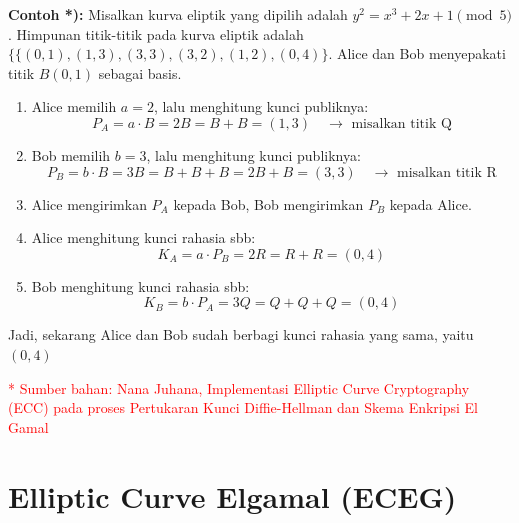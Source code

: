 \documentclass{article}
\begin{document}
\textbf{Contoh *):} Misalkan kurva eliptik yang dipilih adalah $y^2 = x^3 + 2x + 1 \pmod 5$. Himpunan titik-titik pada kurva eliptik adalah $\{\{(0, 1), (1, 3), (3, 3), (3, 2), (1, 2), (0, 4)\}$. Alice dan Bob menyepakati titik $B(0, 1)$ sebagai basis.

\begin{enumerate}
    \item Alice memilih $a = 2$, lalu menghitung kunci publiknya:
    \[ P_A = a \cdot B = 2B = B + B = (1, 3) \quad \rightarrow \text{ misalkan titik Q} \]
    \item Bob memilih $b = 3$, lalu menghitung kunci publiknya:
    \[ P_B = b \cdot B = 3B = B + B + B = 2B + B = (3, 3) \quad \rightarrow \text{ misalkan titik R} \]
    \item Alice mengirimkan $P_A$ kepada Bob, Bob mengirimkan $P_B$ kepada Alice.
    \item Alice menghitung kunci rahasia sbb:
    \[ K_A = a \cdot P_B = 2R = R + R = (0, 4) \]
    \item Bob menghitung kunci rahasia sbb:
    \[ K_B = b \cdot P_A = 3Q = Q + Q + Q = (0, 4) \]
\end{enumerate}

Jadi, sekarang Alice dan Bob sudah berbagi kunci rahasia yang sama, yaitu $(0, 4)$

\vspace{10mm}
\textcolor{red}{* Sumber bahan: Nana Juhana, Implementasi Elliptic Curve Cryptography (ECC) pada proses Pertukaran Kunci Diffie-Hellman dan Skema Enkripsi El Gamal}

\newpage


\section*{Elliptic Curve Elgamal (ECEG)}
\end{document}
